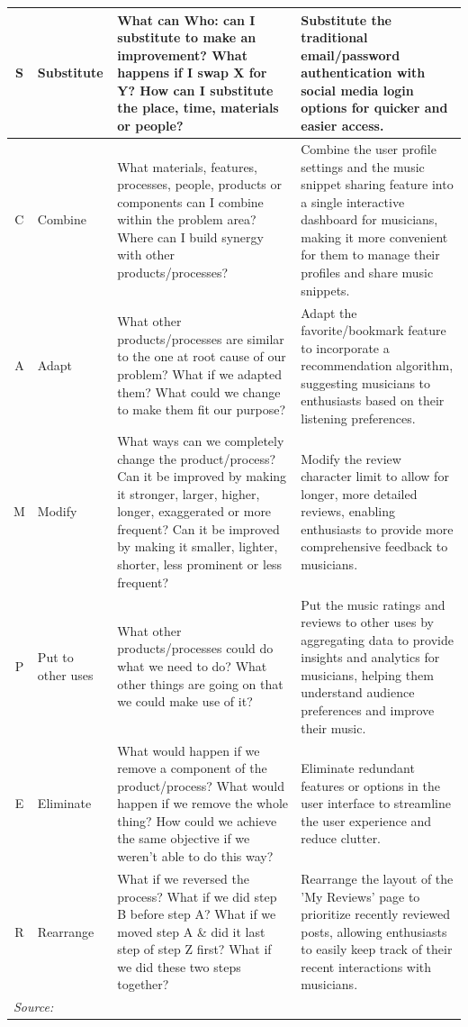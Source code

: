 \begin{longtable}{|c|p{3cm}|p{4.5cm}|p{4.5cm}|}
S & Substitute & What can Who: can I substitute to make an improvement? What happens if I swap X for Y? How can I substitute the place, time, materials or people? & Substitute the traditional email/password authentication with social media login options for quicker and easier access. \\
\hline
C & Combine & What materials, features, processes, people, products or components can I combine within the problem area? Where can I build synergy with other products/processes? & Combine the user profile settings and the music snippet sharing feature into a single interactive dashboard for musicians, making it more convenient for them to manage their profiles and share music snippets. \\
\hline
A & Adapt & What other products/processes are similar to the one at root cause of our problem? What if we adapted them? What could we change to make them fit our purpose? & Adapt the favorite/bookmark feature to incorporate a recommendation algorithm, suggesting musicians to enthusiasts based on their listening preferences. \\
\hline
M & Modify & What ways can we completely change the product/process? Can it be improved by making it stronger, larger, higher, longer, exaggerated or more frequent? Can it be improved by making it smaller, lighter, shorter, less prominent or less frequent? & Modify the review character limit to allow for longer, more detailed reviews, enabling enthusiasts to provide more comprehensive feedback to musicians. \\
\hline
P & Put to other uses & What other products/processes could do what we need to do? What other things are going on that we could make use of it? & Put the music ratings and reviews to other uses by aggregating data to provide insights and analytics for musicians, helping them understand audience preferences and improve their music. \\
\hline
E & Eliminate & What would happen if we remove a component of the product/process? What would happen if we remove the whole thing? How could we achieve the same objective if we weren't able to do this way? & Eliminate redundant features or options in the user interface to streamline the user experience and reduce clutter. \\
\hline
R & Rearrange & What if we reversed the process? What if we did step B before step A? What if we moved step A \& did it last step of step Z first? What if we did these two steps together? & Rearrange the layout of the 'My Reviews' page to prioritize recently reviewed posts, allowing enthusiasts to easily keep track of their recent interactions with musicians. \\
\hline
\multicolumn{4}{l}{\textit{Source: \textcite{santos15}}} \\
\end{longtable}
\pagebreak

